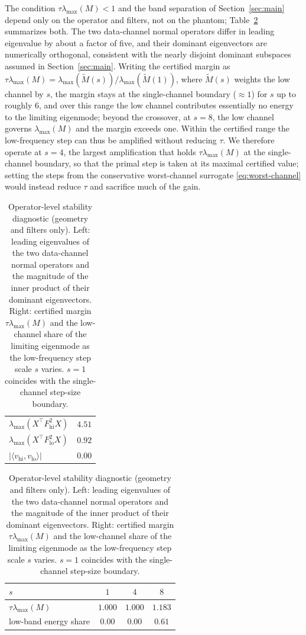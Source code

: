 \documentclass{article}
\begin{document}
The condition $\tau\lambda_{\max}(M)<1$ and the band separation of Section~\ref{sec:main} depend only on the operator and filters, not on the phantom; Table~\ref{tab:stability} summarizes both. The two data-channel normal operators differ in leading eigenvalue by about a factor of five, and their dominant eigenvectors are numerically orthogonal, consistent with the nearly disjoint dominant subspaces assumed in Section~\ref{sec:main}. Writing the certified margin as $\tau\lambda_{\max}(M)=\lambda_{\max}(\widetilde M(s))/\lambda_{\max}(\widetilde M(1))$, where $\widetilde M(s)$ weights the low channel by $s$, the margin stays at the single-channel boundary ($\approx 1$) for $s$ up to roughly $6$, and over this range the low channel contributes essentially no energy to the limiting eigenmode; beyond the crossover, at $s=8$, the low channel governs $\lambda_{\max}(M)$ and the margin exceeds one. Within the certified range the low-frequency step can thus be amplified without reducing $\tau$. We therefore operate at $s=4$, the largest amplification that holds $\tau\lambda_{\max}(M)$ at the single-channel boundary, so that the primal step is taken at its maximal certified value; setting the steps from the conservative worst-channel surrogate \eqref{eq:worst-channel} would instead reduce $\tau$ and sacrifice much of the gain.

\begin{table}[t]
\centering
\caption{Operator-level stability diagnostic (geometry and filters only). Left: leading eigenvalues of the two data-channel normal operators and the magnitude of the inner product of their dominant eigenvectors. Right: certified margin $\tau\lambda_{\max}(M)$ and the low-channel share of the limiting eigenmode as the low-frequency step scale $s$ varies. $s=1$ coincides with the single-channel step-size boundary.}
\label{tab:stability}
\begin{tabular}{lc}
\toprule
$\lambda_{\max}(X^\top F_{\mathrm{hi}}^2 X)$ & $4.51$\\
$\lambda_{\max}(X^\top F_{\mathrm{lo}}^2 X)$ & $0.92$\\
$|\langle v_{\mathrm{hi}},v_{\mathrm{lo}}\rangle|$ & $0.00$\\
\bottomrule
\end{tabular}
\qquad
\begin{tabular}{lccc}
\toprule
$s$ & $1$ & $4$ & $8$\\
\midrule
$\tau\lambda_{\max}(M)$ & $1.000$ & $1.000$ & $1.183$\\
low-band energy share & $0.00$ & $0.00$ & $0.61$\\
\bottomrule
\end{tabular}
\end{table}
\end{document}
